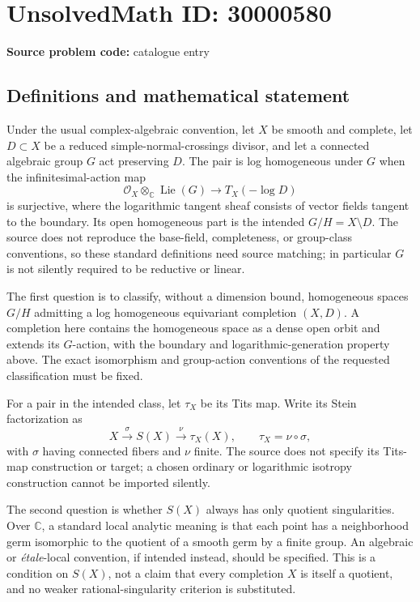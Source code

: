 \documentclass[11pt]{article}
\newcommand{\C}{\mathbb{C}}
\begin{document}
\section*{UnsolvedMath ID: 30000580}
\textbf{Source problem code:} catalogue entry
\subsection{Definitions and mathematical statement}
Under the usual complex-algebraic convention, let \(X\) be smooth and complete, let \(D\subset X\) be a reduced simple-normal-crossings divisor, and let a connected algebraic group \(G\) act preserving \(D\). The pair is log homogeneous under \(G\) when the infinitesimal-action map
\[
\mathcal O_X\otimes_{\C}\operatorname{Lie}(G)\longrightarrow T_X(-\log D)
\]
is surjective, where the logarithmic tangent sheaf consists of vector fields tangent to the boundary. Its open homogeneous part is the intended \(G/H=X\setminus D\). The source does not reproduce the base-field, completeness, or group-class conventions, so these standard definitions need source matching; in particular \(G\) is not silently required to be reductive or linear.

The first question is to classify, without a dimension bound, homogeneous spaces \(G/H\) admitting a log homogeneous equivariant completion \((X,D)\). A completion here contains the homogeneous space as a dense open orbit and extends its \(G\)-action, with the boundary and logarithmic-generation property above. The exact isomorphism and group-action conventions of the requested classification must be fixed.

For a pair in the intended class, let \(\tau_X\) be its Tits map. Write its Stein factorization as
\[
X\xrightarrow{\sigma}S(X)\xrightarrow{\nu}\tau_X(X),
\qquad\tau_X=\nu\circ\sigma,
\]
with \(\sigma\) having connected fibers and \(\nu\) finite. The source does not specify its Tits-map construction or target; a chosen ordinary or logarithmic isotropy construction cannot be imported silently.

The second question is whether \(S(X)\) always has only quotient singularities. Over \(\C\), a standard local analytic meaning is that each point has a neighborhood germ isomorphic to the quotient of a smooth germ by a finite group. An algebraic or \emph{\'etale}-local convention, if intended instead, should be specified. This is a condition on \(S(X)\), not a claim that every completion \(X\) is itself a quotient, and no weaker rational-singularity criterion is substituted.
\end{document}
